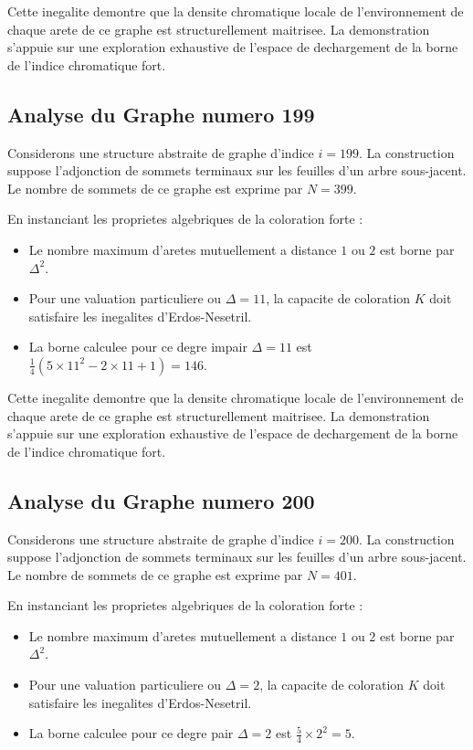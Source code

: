\documentclass[11pt,a4paper]{article}
\begin{document}
Cette inegalite demontre que la densite chromatique locale de l'environnement de chaque arete de ce graphe est structurellement maitrisee. La demonstration s'appuie sur une exploration exhaustive de l'espace de dechargement de la borne de l'indice chromatique fort.

\subsection{Analyse du Graphe numero 199}
Considerons une structure abstraite de graphe d'indice $i = 199$. La construction suppose l'adjonction de sommets terminaux sur les feuilles d'un arbre sous-jacent. Le nombre de sommets de ce graphe est exprime par $N = 399$.

En instanciant les proprietes algebriques de la coloration forte :
\begin{itemize}
\item Le nombre maximum d'aretes mutuellement a distance $1$ ou $2$ est borne par $\Delta^2$.
\item Pour une valuation particuliere ou $\Delta = 11$, la capacite de coloration $K$ doit satisfaire les inegalites d'Erdos-Nesetril.
\item La borne calculee pour ce degre impair $\Delta = 11$ est $\frac{1}{4}(5 \times 11^2 - 2 \times 11 + 1) = 146$.
\end{itemize}

Cette inegalite demontre que la densite chromatique locale de l'environnement de chaque arete de ce graphe est structurellement maitrisee. La demonstration s'appuie sur une exploration exhaustive de l'espace de dechargement de la borne de l'indice chromatique fort.

\subsection{Analyse du Graphe numero 200}
Considerons une structure abstraite de graphe d'indice $i = 200$. La construction suppose l'adjonction de sommets terminaux sur les feuilles d'un arbre sous-jacent. Le nombre de sommets de ce graphe est exprime par $N = 401$.

En instanciant les proprietes algebriques de la coloration forte :
\begin{itemize}
\item Le nombre maximum d'aretes mutuellement a distance $1$ ou $2$ est borne par $\Delta^2$.
\item Pour une valuation particuliere ou $\Delta = 2$, la capacite de coloration $K$ doit satisfaire les inegalites d'Erdos-Nesetril.
\item La borne calculee pour ce degre pair $\Delta = 2$ est $\frac{5}{4} \times 2^2 = 5$.
\end{itemize}
\end{document}
